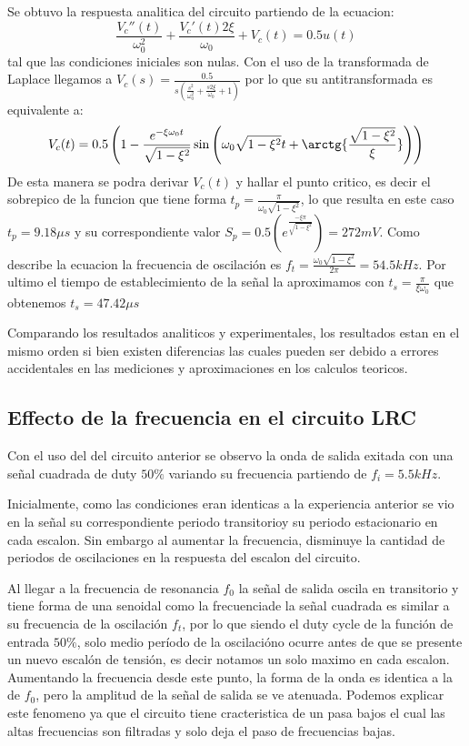 Se obtuvo la respuesta analitica del circuito partiendo de la ecuacion: $$\frac{V_c''(t)}{\omega_0^2} + \frac{V_c'(t) 2\xi}{\omega_0} + V_c(t) =  0.5u(t)$$ tal que las condiciones iniciales son nulas. Con el uso de la transformada de Laplace llegamos a $V_c(s) = \frac{0.5}{s(\frac{s^2}{\omega_0^2}+\frac{s2\xi}{\omega_0}+1)}$ por lo que su antitransformada es equivalente a:$$V_c(t) = 0.5\left(1-\frac{e^{-\xi\omega_0t}}{\sqrt{1-\xi^2}}\sin{\left(\omega_0\sqrt{1-\xi^2}t+\arctg{\frac{\sqrt{{1-\xi^2}}}{\xi}}\right)}\right)$$ 
De esta manera se podra derivar $V_c(t)$ y hallar el punto critico, es decir el sobrepico de la funcion que tiene forma $t_p=\frac{\pi}{\omega_0\sqrt{1-\xi^2}}$, lo que resulta en este caso $t_p=9.18{\mu}s$ y su correspondiente valor $S_p=0.5\left(e^{\frac{-\xi\pi}{\sqrt{1-\xi^2}}}\right) =272mV$. Como describe la ecuacion la frecuencia de oscilación es $f_t= \frac{\omega_0\sqrt{1-\xi^2}}{2\pi} = 54.5kHz$. Por ultimo el tiempo de establecimiento de la señal la aproximamos con $t_s=\frac{\pi}{\xi\omega_0}$ que obtenemos $t_s = 47.42{\mu}s$

Comparando los resultados analiticos y experimentales, los resultados estan en el mismo orden si bien existen diferencias las cuales pueden ser debido a errores accidentales en las mediciones y aproximaciones en los calculos teoricos. 

\subsection{Effecto de la frecuencia en el circuito LRC}

Con el uso del del circuito anterior se observo la onda de salida exitada con una señal cuadrada de duty $50\%$ variando su frecuencia partiendo de $f_i=5.5kHz$.

Inicialmente, como las condiciones eran identicas a la experiencia anterior se vio en la señal su correspondiente periodo transitorioy su periodo estacionario en cada escalon. Sin embargo al aumentar la frecuencia, disminuye la cantidad de periodos de oscilaciones en la respuesta del escalon del circuito. 

Al llegar a la frecuencia de resonancia $f_0$ la señal de salida oscila en transitorio y tiene forma de una senoidal como la frecuenciade la señal cuadrada es similar a su frecuencia de la oscilación $f_t$, por lo que siendo el duty cycle de la función de entrada $50\%$, solo medio período de la oscilacióno ocurre antes de que se presente un nuevo escalón de tensión, es decir notamos un solo maximo en cada escalon. Aumentando la frecuencia desde este punto, la forma de la onda es identica a la de $f_0$, pero la amplitud de la señal de salida se ve atenuada. Podemos explicar este fenomeno ya que el circuito tiene cracteristica de un pasa bajos el cual las altas frecuencias son filtradas y solo deja el paso de frecuencias bajas. 

